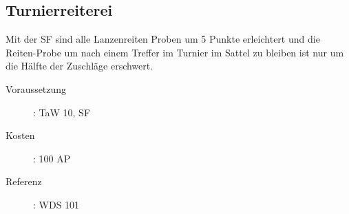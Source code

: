 \subsection{Turnierreiterei}
\label{sf.turnierreiterei}
Mit der SF  sind alle Lanzenreiten Proben um 5 Punkte erleichtert und die Reiten-Probe um nach einem Treffer im Turnier im Sattel zu bleiben ist nur um die Hälfte der Zuschläge erschwert.
\begin{description}
    \item[Voraussetzung]:
        TaW  10, SF 
    \item [Kosten]:
        100 AP
    \item [Referenz]:
        WDS 101
\end{description}
